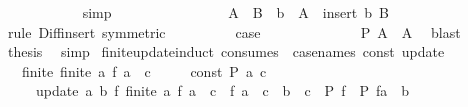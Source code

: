 \begin{isabellebody}
\ \ \ \ \ \ \ \ \ \ \isamarkupfalse%
\ simp\isanewline
\ \ \ \ \ \ \isamarkupfalse%
\isanewline
\ \ \ \ \ \ \isamarkupfalse%
\ \isamarkupfalse%
\ {\isachardoublequoteopen}A\ {\isacharminus}{\kern0pt}\ B\ {\isacharminus}{\kern0pt}\ {\isacharbraceleft}{\kern0pt}b{\isacharbraceright}{\kern0pt}\ {\isacharequal}{\kern0pt}\ A\ {\isacharminus}{\kern0pt}\ insert\ b\ B{\isachardoublequoteclose}\isanewline
\ \ \ \ \ \ \ \ \isamarkupfalse%
\ {\isacharparenleft}{\kern0pt}rule\ Diff{\isacharunderscore}{\kern0pt}insert\ {\isacharbrackleft}{\kern0pt}symmetric{\isacharbrackright}{\kern0pt}{\isacharparenright}{\kern0pt}\isanewline
\ \ \ \ \ \ \isamarkupfalse%
\ \isamarkupfalse%
\ {\isacharquery}{\kern0pt}case\ \isacommand{{\isachardot}{\kern0pt}}\isamarkupfalse%
\isanewline
\ \ \ \ \isamarkupfalse%
\isanewline
\ \ \isamarkupfalse%
\isanewline
\ \ \isamarkupfalse%
\ \isamarkupfalse%
\ {\isachardoublequoteopen}P\ {\isacharparenleft}{\kern0pt}A\ {\isacharminus}{\kern0pt}\ A{\isacharparenright}{\kern0pt}{\isachardoublequoteclose}\ \isamarkupfalse%
\ blast\isanewline
\ \ \isamarkupfalse%
\ \isamarkupfalse%
\ {\isacharquery}{\kern0pt}thesis\ \isamarkupfalse%
\ simp\isanewline
{}\isamarkupfalse%
%
\endisatagproof
{\isafoldproof}%
%
\isadelimproof
\isanewline
%
\endisadelimproof
\isanewline
{}\isamarkupfalse%
\ finite{\isacharunderscore}{\kern0pt}update{\isacharunderscore}{\kern0pt}induct\ {\isacharbrackleft}{\kern0pt}consumes\ {}{\isacharcomma}{\kern0pt}\ case{\isacharunderscore}{\kern0pt}names\ const\ update{\isacharbrackright}{\kern0pt}{\isacharcolon}{\kern0pt}\isanewline
\ \ \ finite{\isacharcolon}{\kern0pt}\ {\isachardoublequoteopen}finite\ {\isacharbraceleft}{\kern0pt}a{\isachardot}{\kern0pt}\ f\ a\ {\isasymnoteq}\ c{\isacharbraceright}{\kern0pt}{\isachardoublequoteclose}\isanewline
\ \ \ \ \ const{\isacharcolon}{\kern0pt}\ {\isachardoublequoteopen}P\ {\isacharparenleft}{\kern0pt}{\isasymlambda}a{\isachardot}{\kern0pt}\ c{\isacharparenright}{\kern0pt}{\isachardoublequoteclose}\isanewline
\ \ \ \ \ update{\isacharcolon}{\kern0pt}\ {\isachardoublequoteopen}{\isasymAnd}a\ b\ f{\isachardot}{\kern0pt}\ finite\ {\isacharbraceleft}{\kern0pt}a{\isachardot}{\kern0pt}\ f\ a\ {\isasymnoteq}\ c{\isacharbraceright}{\kern0pt}\ {\isasymLongrightarrow}\ f\ a\ {\isacharequal}{\kern0pt}\ c\ {\isasymLongrightarrow}\ b\ {\isasymnoteq}\ c\ {\isasymLongrightarrow}\ P\ f\ {\isasymLongrightarrow}\ P\ {\isacharparenleft}{\kern0pt}f{\isacharparenleft}{\kern0pt}a\ {\isacharcolon}{\kern0pt}{\isacharequal}{\kern0pt}\ b{\isacharparenright}{\kern0pt}{\isacharparenright}{\kern0pt}{\isachardoublequoteclose}\isanewline

\end{isabellebody}
